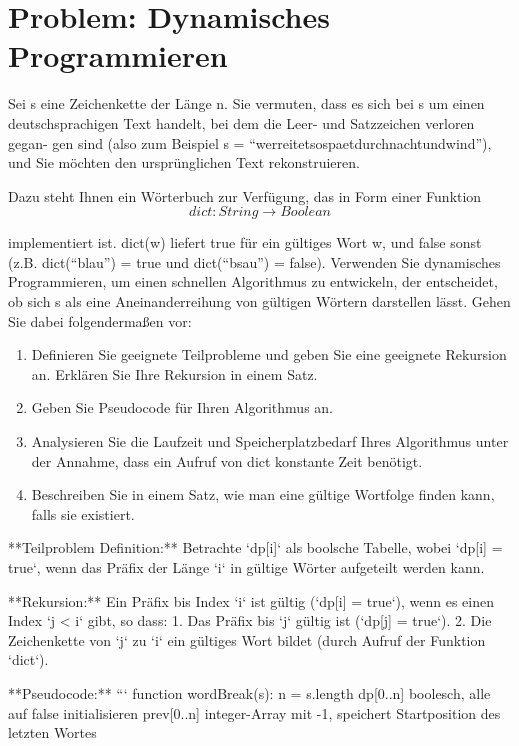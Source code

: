 \section{Problem: Dynamisches Programmieren}

Sei s eine Zeichenkette der Länge n. Sie vermuten, dass es sich bei s um einen
deutschsprachigen Text handelt, bei dem die Leer- und Satzzeichen verloren gegan-
gen sind (also zum Beispiel s = “werreitetsospaetdurchnachtundwind”), und Sie
möchten den ursprünglichen Text rekonstruieren.

\vspace{1em}

\noindent
Dazu steht Ihnen ein Wörterbuch zur Verfügung, das in Form einer Funktion
$$dict : String \rightarrow Boolean$$

\noindent
implementiert ist. dict(w) liefert true für ein gültiges Wort w, und false sonst
(z.B. dict(“blau”) = true und dict(“bsau”) = false).
Verwenden Sie dynamisches Programmieren, um einen schnellen Algorithmus zu
entwickeln, der entscheidet, ob sich s als eine Aneinanderreihung von gültigen
Wörtern darstellen lässt. Gehen Sie dabei folgendermaßen vor:

\begin{enumerate}
	\item Definieren Sie geeignete Teilprobleme und geben Sie eine geeignete Rekursion an. Erklären Sie Ihre Rekursion in einem Satz.
	\item Geben Sie Pseudocode für Ihren Algorithmus an.
	\item Analysieren Sie die Laufzeit und Speicherplatzbedarf Ihres Algorithmus unter der Annahme, dass ein Aufruf von dict konstante Zeit benötigt.
	\item Beschreiben Sie in einem Satz, wie man eine gültige Wortfolge finden kann,
	falls sie existiert.
\end{enumerate}

**Teilproblem Definition:**  
Betrachte `dp[i]` als boolsche Tabelle, wobei `dp[i] = true`, wenn das Präfix der Länge `i` in 
gültige Wörter aufgeteilt werden kann.  

**Rekursion:**  
Ein Präfix bis Index `i` ist gültig (`dp[i] = true`), wenn es einen Index `j < i` gibt, so dass:  
1. Das Präfix bis `j` gültig ist (`dp[j] = true`).  
2. Die Zeichenkette von `j` zu `i` ein gültiges Wort bildet (durch Aufruf der Funktion `dict`).  

**Pseudocode:**  
```
function wordBreak(s):
n = s.length
dp[0..n] boolesch, alle auf false initialisieren
prev[0..n] integer-Array mit -1, speichert Startposition des letzten Wortes


